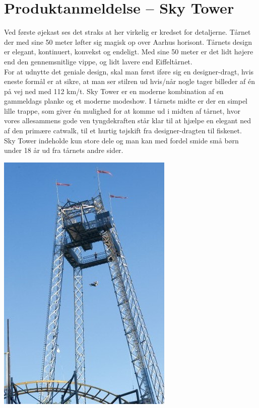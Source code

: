 \begin{minipage}[t]{100mm}
\section*{Produktanmeldelse – Sky Tower}
Ved første øjekast ses det straks at her virkelig er kredset for detaljerne. Tårnet der med sine 50 meter løfter sig magisk op over Aarhus horisont. Tårnets design er elegant, kontinuert, konvekst og endeligt. Med sine 50 meter er det lidt højere end den gennemsnitlige vippe, og lidt lavere end Eiffeltårnet. \\
For at udnytte det geniale design, skal man først iføre sig en designer-dragt, hvis eneste formål er at sikre, at man ser stilren ud hvis/når nogle tager billeder af én på vej ned med 112 km/t. Sky Tower er en moderne kombination af en gammeldags planke og et moderne modeshow. I tårnets midte er der en simpel lille trappe, som giver én mulighed for at komme ud i midten af tårnet, hvor vores allesammens gode ven tyngdekraften står klar til at hjælpe en elegant ned af den primære catwalk, til et hurtig tøjskift fra designer-dragten til fiskenet.\\
Sky Tower indeholde kun store dele og man kan med fordel smide små børn under 18 år ud fra tårnets andre sider.
\begin{center}
\includegraphics[width=0.5\linewidth]{Sky_Tower.jpg}
\end{center}
\end{minipage}

